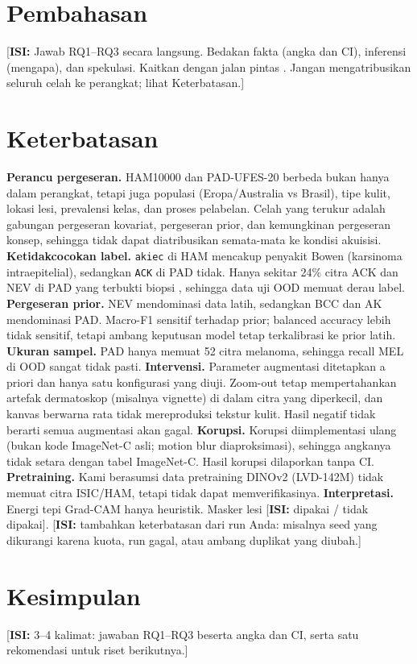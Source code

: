 \documentclass[conference]{IEEEtran}
\newif\ifdraft \drafttrue
\newcommand{\TODO}[1]{\ifdraft{\color{red}[\textbf{ISI:} #1]}\else{\color{red}[TODO BELUM DIISI]}\fi}
\begin{document}
\section{Pembahasan}
\TODO{Jawab RQ1--RQ3 secara langsung. Bedakan fakta (angka dan CI), inferensi (mengapa), dan spekulasi. Kaitkan dengan jalan pintas \cite{geirhos2020shortcut}. Jangan mengatribusikan seluruh celah ke perangkat; lihat Keterbatasan.}

\section{Keterbatasan}
\textbf{Perancu pergeseran.} HAM10000 dan PAD-UFES-20 berbeda bukan hanya dalam perangkat, tetapi juga populasi (Eropa/Australia vs Brasil), tipe kulit, lokasi lesi, prevalensi kelas, dan proses pelabelan. Celah yang terukur adalah gabungan pergeseran kovariat, pergeseran prior, dan kemungkinan pergeseran konsep, sehingga tidak dapat diatribusikan semata-mata ke kondisi akuisisi.
\textbf{Ketidakcocokan label.} \texttt{akiec} di HAM mencakup penyakit Bowen (karsinoma intraepitelial), sedangkan \texttt{ACK} di PAD tidak. Hanya sekitar 24\% citra ACK dan NEV di PAD yang terbukti biopsi \cite{pacheco2020pad}, sehingga data uji OOD memuat derau label.
\textbf{Pergeseran prior.} NEV mendominasi data latih, sedangkan BCC dan AK mendominasi PAD. Macro-F1 sensitif terhadap prior; balanced accuracy lebih tidak sensitif, tetapi ambang keputusan model tetap terkalibrasi ke prior latih.
\textbf{Ukuran sampel.} PAD hanya memuat 52 citra melanoma, sehingga recall MEL di OOD sangat tidak pasti.
\textbf{Intervensi.} Parameter augmentasi ditetapkan a priori dan hanya satu konfigurasi yang diuji. Zoom-out tetap mempertahankan artefak dermatoskop (misalnya vignette) di dalam citra yang diperkecil, dan kanvas berwarna rata tidak mereproduksi tekstur kulit. Hasil negatif tidak berarti semua augmentasi akan gagal.
\textbf{Korupsi.} Korupsi diimplementasi ulang (bukan kode ImageNet-C asli; motion blur diaproksimasi), sehingga angkanya tidak setara dengan tabel ImageNet-C. Hasil korupsi dilaporkan tanpa CI.
\textbf{Pretraining.} Kami berasumsi data pretraining DINOv2 (LVD-142M) tidak memuat citra ISIC/HAM, tetapi tidak dapat memverifikasinya.
\textbf{Interpretasi.} Energi tepi Grad-CAM hanya heuristik. Masker lesi \TODO{dipakai / tidak dipakai}. \TODO{tambahkan keterbatasan dari run Anda: misalnya seed yang dikurangi karena kuota, run gagal, atau ambang duplikat yang diubah.}

\section{Kesimpulan}
\TODO{3--4 kalimat: jawaban RQ1--RQ3 beserta angka dan CI, serta satu rekomendasi untuk riset berikutnya.}
\end{document}
